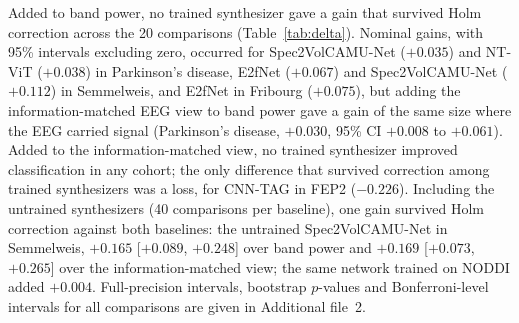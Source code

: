 \documentclass[pdflatex,referee,sn-basic]{sn-jnl}%
\begin{document}
Added to band power, no trained synthesizer gave a gain that survived Holm correction across the 20 comparisons (Table~\ref{tab:delta}). Nominal gains, with 95\% intervals excluding zero, occurred for Spec2VolCAMU-Net ($+0.035$) and NT-ViT ($+0.038$) in Parkinson's disease, E2fNet ($+0.067$) and Spec2VolCAMU-Net ($+0.112$) in Semmelweis, and E2fNet in Fribourg ($+0.075$), but adding the information-matched EEG view to band power gave a gain of the same size where the EEG carried signal (Parkinson's disease, $+0.030$, 95\% CI $+0.008$ to $+0.061$). Added to the information-matched view, no trained synthesizer improved classification in any cohort; the only difference that survived correction among trained synthesizers was a loss, for CNN-TAG in FEP2 ($-0.226$). Including the untrained synthesizers (40 comparisons per baseline), one gain survived Holm correction against both baselines: the untrained Spec2VolCAMU-Net in Semmelweis, $+0.165$ [$+0.089$, $+0.248$] over band power and $+0.169$ [$+0.073$, $+0.265$] over the information-matched view; the same network trained on NODDI added $+0.004$. Full-precision intervals, bootstrap $p$-values and Bonferroni-level intervals for all comparisons are given in Additional file~2.
\end{document}
